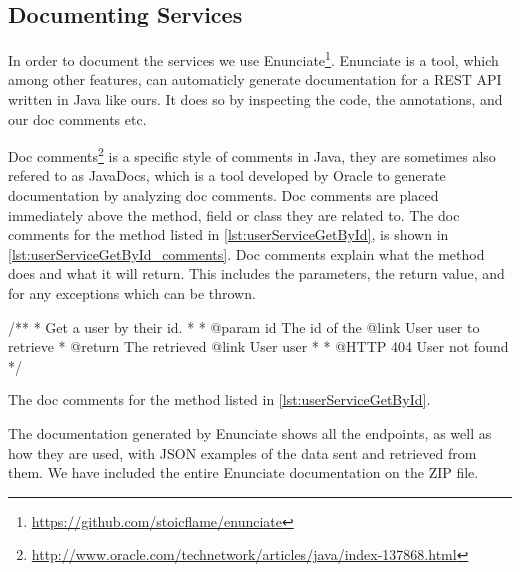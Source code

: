 \subsection{Documenting Services}
In order to document the services we use Enunciate\footnote{\url{https://github.com/stoicflame/enunciate}}.
Enunciate is a tool, which among other features, can automaticly generate documentation for a REST API written in Java like ours.
It does so by inspecting the code, the annotations, and our doc comments etc.

Doc comments\footnote{\url{http://www.oracle.com/technetwork/articles/java/index-137868.html}} is a specific style of comments in Java, they are sometimes also refered to as JavaDocs, which is a tool developed by Oracle to generate documentation by analyzing doc comments.
Doc comments are placed immediately above the method, field or class they are related to.
The doc comments for the method listed in \cref{lst:userServiceGetById}, is shown in \cref{lst:userServiceGetById_comments}.
Doc comments explain what the method does and what it will return.
This includes the parameters, the return value, and for any exceptions which can be thrown.

\begin{listing}
    \begin{java2}
/**
 * Get a user by their id.
 *
 * @param id The id of the {@link User user} to retrieve
 * @return The retrieved {@link User user}
 *
 * @HTTP 404 User not found
 */
    \end{java2}
    \caption{The doc comments for the method listed in \cref{lst:userServiceGetById}.}\label{lst:userServiceGetById_comments}
\end{listing}

The documentation generated by Enunciate shows all the endpoints, as well as how they are used,
with JSON examples of the data sent and retrieved from them.
We have included the entire Enunciate documentation on the ZIP file.

